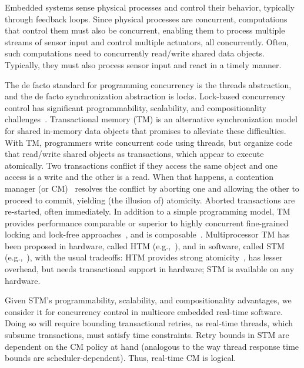 \documentclass{sig-alternate}
\begin{document}
Embedded systems sense physical processes and control their behavior, typically through feedback loops. Since physical processes are concurrent, computations that control them must also be concurrent, enabling them to process multiple streams of sensor input and control multiple actuators, all concurrently. Often, such computations need to concurrently read/write shared data objects. Typically, they must also process sensor input and react in a timely manner. 

The de facto standard for programming concurrency is the threads abstraction, and the de facto synchronization abstraction is locks. 
Lock-based concurrency control has significant programmability, scalability, and compositionality challenges~\cite{Herlihy:2006:AMP:1146381.1146382}. Transactional memory (TM) is an alternative synchronization model for shared in-memory data objects that promises to alleviate these difficulties.  With TM, programmers write concurrent code using threads, but organize code that read/write shared objects as transactions, which appear to execute atomically. Two transactions conflict if they access the same object and one access is a write and the other is a read. When that happens, a contention manager (or CM)~\cite{Guerraoui:2005:TTT:1073814.1073863} resolves the conflict by aborting one and allowing the other to proceed to commit, yielding (the illusion of) atomicity. Aborted transactions are re-started, often immediately.  In addition to a simple programming model, TM provides performance comparable or superior to highly concurrent fine-grained locking and lock-free approaches~\cite{Saha:2006:MHP:1122971.1123001}, and is composable~\cite{Harris:2005:CMT:1065944.1065952}. Multiprocessor TM has been proposed in hardware, called HTM (e.g.,~\cite{austenmc:tcc:dissertation:2009}), and in software, called STM (e.g.,~\cite{sha95}), with the usual tradeoffs: HTM provides strong atomicity~\cite{austenmc:tcc:dissertation:2009}, has lesser overhead, but needs transactional support in hardware; STM is available on any hardware.


Given STM's programmability, scalability, and compositionality advantages, we consider it for concurrency control in multicore embedded real-time software. Doing so will require bounding transactional  retries, as real-time threads, which subsume transactions, must satisfy time constraints.  Retry bounds in STM are dependent on the CM policy at hand (analogous to the way thread response time bounds are scheduler-dependent). Thus, real-time CM is logical.
\end{document}
